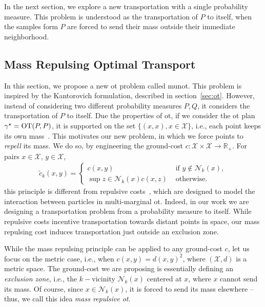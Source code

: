 In the next section, we explore a new transportation with a single probability measure. This problem is understood as the transportation of $P$ to itself, when the samples form $P$ are forced to send their mass outside their immediate neighborhood.

\subsection{Mass Repulsing Optimal Transport}\label{sec:munot}

In this section, we propose a new \gls{ot} problem called \gls{munot}. This problem is inspired by the Kantorovich formulation, described in section~\ref{sec:ot}. However, instead of considering two different probability measures $P, Q$, it considers the transportation of $P$ to itself. Due the properties of \gls{ot}, if we consider the \gls{ot} plan $\gamma^{\star} = {\text{OT}}(P, P)$, it is supported on the set $\{(x, x), x \in \mathcal{X}\}$, i.e., each point keeps its own mass~\citep{santambrogio2015optimal}. This motivates our new problem, in which we force points to \emph{repell} its mass. We do so, by engineering the ground-cost $c:\mathcal{X}\times\mathcal{X} \rightarrow \mathbb{R}_{+}$. For pairs $x \in \mathcal{X}$, $y \in \mathcal{X}$,
\begin{align}
    \tilde{c}_{k}(x, y) = \begin{cases}
        c(x, y) & \text{ if }y \not\in \mathcal{N}_{k}(x),\\
        \sup{z \in \mathcal{N}_{k}(x)}c(x, z) & \text{ otherwise}.
    \end{cases}\label{eq:engineered_cost}
\end{align}
this principle is different from repulsive costs~\citep{di2017optimal}, which are designed to model the interaction between particles in multi-marginal \gls{ot}. Indeed, in our work we are designing a transportation problem from a probability measure to itself. While repulsive costs incentive transportation towards distant points in space, our mass repulsing cost induces transportation just outside an exclusion zone.

While the mass repulsing principle can be applied to any ground-cost $c$, let us focus on the metric case, i.e., when $c(x, y) = d(x, y)^{2}$, where $(\mathcal{X}, d)$ is a metric space. The ground-cost we are proposing is essentially defining an \emph{exclusion zone}, i.e., the $k-$vicinity $\mathcal{N}_{k}(x)$ centered at $x$, where $x$ cannot send its mass. Of course, since $x \in \mathcal{N}_{k}(x)$, it is forced to send its mass elsewhere -- thus, we call this idea \emph{mass repulsive \gls{ot}}.

